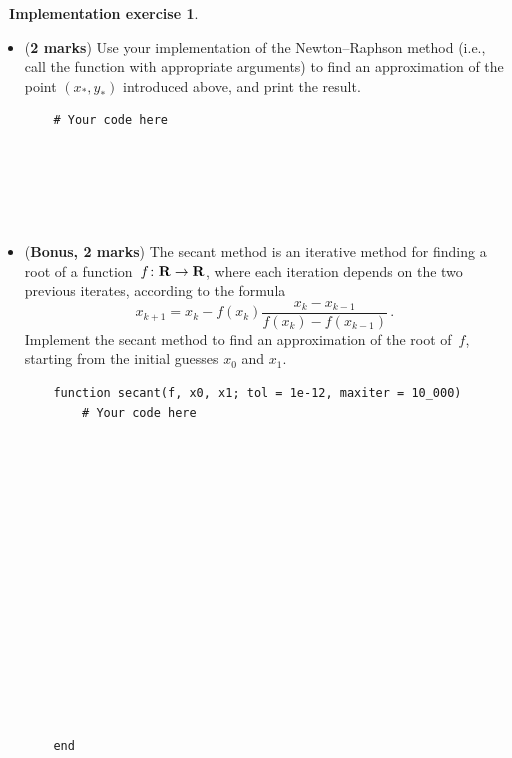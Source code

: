 \documentclass[10pt]{article}
\theoremstyle{definition}
\newtheorem{compexercise}{{\normalfont \faLaptop}~Implementation exercise}
\renewcommand{\mymarks}[1]{\textbf{#1 marks}}
\begin{document}
\begin{compexercise}
\begin{itemize}
\begin{verbatim}
    end
            \end{verbatim}

        \item
            (\mymarks{2})
            Use your implementation of the Newton--Raphson method (i.e., call the function with appropriate arguments) to find an approximation of the point $(x_*, y_*)$ introduced above,
            and print the result.
            \begin{verbatim}
    # Your code here






            \end{verbatim}

        \item
            (\textbf{Bonus, 2 marks})
            The secant method is an iterative method for finding a root of a function~$f \colon \mathbf R \to \mathbf R$,
            where each iteration depends on the two previous iterates,
            according to the formula
            \[
                x_{k+1} = x_k - f(x_k) \frac{x_k - x_{k-1}}{f(x_k) - f(x_{k-1})} \, .
            \]
            Implement the secant method to find an approximation of the root of~$f$,
            starting from the initial guesses $x_0$ and $x_1$.
            \begin{verbatim}
    function secant(f, x0, x1; tol = 1e-12, maxiter = 10_000)
        # Your code here
















    end
            \end{verbatim}
    \end{itemize}
\end{compexercise}
\end{document}
